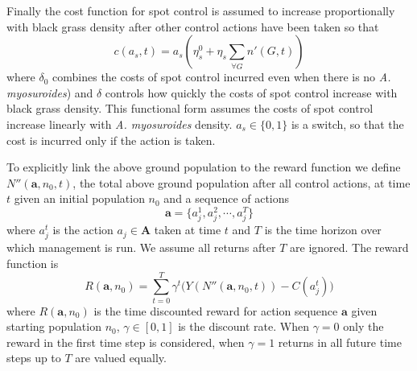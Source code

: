 \documentclass[12pt, a4paper]{article}
\begin{document}
Finally the cost function for spot control is assumed to increase proportionally with black grass density after other control actions have been taken so that
\begin{equation}
	c(a_s, t) = a_s\left(\eta_s^0 + \eta_s \sum_{\forall G} n'(G, t)\right)
\end{equation}  
where $\delta_0$ combines the costs of spot control incurred even when there is no \textit{A. myosuroides}) and $\delta$ controls how quickly the costs of spot control increase with black grass density. This functional form assumes the costs of spot control increase linearly with \textit{A. myosuroides} density. $a_s \in \{0, 1\}$ is a switch, so that the cost is incurred only if the action is taken.       

To explicitly link the above ground population to the reward function we define $N''(\mathbf{a}, n_0, t)$, the total above ground population after all control actions, at time $t$ given an initial population $n_0$ and a sequence of actions 
\begin{equation}
	\mathbf{a} = \{a_j^1, a_j^2, \cdots, a_j^T\}
\end{equation}	   
where $a_j^t$ is the action $a_j \in \mathbf{A}$ taken at time $t$ and $T$ is the time horizon over which management is run. We assume all returns after $T$ are ignored. The reward function is  
\begin{equation}
	R(\mathbf{a}, n_0) = \sum_{t=0}^T \gamma^t \Big( Y(N''(\mathbf{a}, n_0, t)) - C(a_j^t) \Big)
\end{equation}
where $R(\mathbf{a}, n_0)$ is the time discounted reward for action sequence $\mathbf{a}$ given starting population $n_0$, $\gamma \in [0, 1]$ is the discount rate. When $\gamma = 0$ only the reward in the first time step is considered, when $\gamma = 1$ returns in all future time steps up to $T$ are valued equally.
\end{document}
